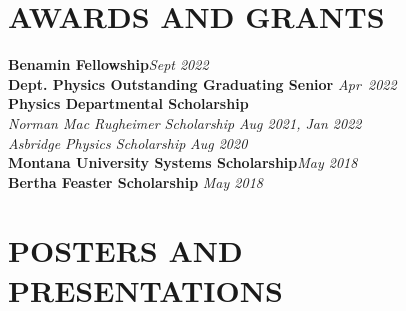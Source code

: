 \documentclass[margin]{res}
\begin{document}
\begin{resume}
\section{\uppercase{Awards and Grants}}
\textbf{Benamin Fellowship}\hfill {\sl Sept 2022}\vspace*{1ex}\\
\textbf{Dept. Physics Outstanding Graduating Senior} \hfill {\sl Apr~2022}\vspace*{1ex}\\
\textbf{Physics Departmental Scholarship}\\
\hspace{3ex} {\sl Norman Mac Rugheimer Scholarship} \hfill {\sl Aug 2021, Jan 2022}\\
\hspace{3ex} {\sl Asbridge Physics Scholarship} \hfill {\sl Aug 2020}\vspace*{1ex}\\
\textbf{Montana University Systems Scholarship}\hfill\hfil {\sl May 2018}\vspace*{1ex}\\
\textbf{Bertha Feaster Scholarship} \hfill {\sl May 2018}

\section{\uppercase{Posters and Presentations}}


\end{resume}
\end{document}
